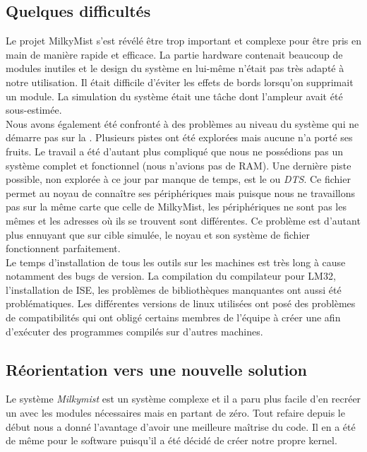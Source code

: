 \subsection{Quelques difficultés}

Le projet MilkyMist s'est révélé être trop important et complexe pour être pris en main de manière rapide et efficace. La partie hardware contenait beaucoup de modules inutiles et le design du système en lui-même n'était pas très adapté à notre utilisation. Il était difficile d'éviter les effets de bords lorsqu'on supprimait un module. La simulation du système était une tâche dont l'ampleur avait été sous-estimée.\\
Nous avons également été confronté à des problèmes au niveau du système qui ne démarre pas sur la \nexys{}. Plusieurs pistes ont été explorées mais aucune n'a porté ses fruits. Le travail a été d'autant plus compliqué que nous ne possédions pas un système complet et fonctionnel (nous n'avions pas de RAM). Une dernière piste possible, non explorée à ce jour par manque de temps, est le  ou \textit{DTS}. Ce fichier permet au noyau de connaître ses périphériques mais puisque nous ne travaillons pas sur la même carte que celle de MilkyMist, les périphériques ne sont pas les mêmes et les adresses où ils se trouvent sont différentes. Ce problème est d'autant plus ennuyant que sur cible simulée, le noyau et son système de fichier fonctionnent parfaitement.\\
Le temps d'installation de tous les outils sur les machines est très long à cause notamment des bugs de version. La compilation du compilateur pour LM32, l'installation de ISE, les problèmes de bibliothèques manquantes ont aussi été problématiques. Les différentes versions de linux utilisées ont posé des problèmes de compatibilités qui ont obligé certains membres de l'équipe à créer une  afin d'exécuter des programmes compilés sur d'autres machines.

\subsection{Réorientation vers une nouvelle solution }

Le système \textit{Milkymist} est un système complexe et il a paru plus facile d'en recréer un avec les modules nécessaires mais en partant de zéro. Tout refaire depuis le début nous a donné l'avantage d'avoir une meilleure maîtrise du code. Il en a été de même pour le software puisqu'il a été décidé de créer notre propre kernel.